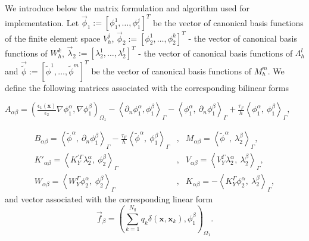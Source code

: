 We introduce below the matrix formulation and algorithm used for implementation. Let $\vec{\phi}_1 := [\phi_1^1, \dots, \phi_1^j]^T$ be the vector of canonical basis
functions of the finite element space $V_{h}^{j}$, $\vec{\phi}_2 := [\phi_2^1, \dots, \phi_2^k]^T$ - the vector of canonical basis
functions of $W_{h}^{k}$,  $\vec{\lambda}_2 := [\lambda_2^1, \dots, \lambda_2^l]^T$ - the vector of canonical basis
functions of $\Lambda_{h}^{l}$ and $\vec{\widetilde{\phi}} := [\widetilde{\phi}^1, \dots, \widetilde{\phi}^m]^T$ be the vector of canonical basis
functions of  $M_{h}^{m}$. We define the following matrices associated with the corresponding bilinear forms
\begin{center}
$A_{\alpha \beta} = \left(  \tfrac{\epsilon_1(\mathbf{x})}{\epsilon_2} \nabla \phi^{\alpha}_1, \nabla \phi^{\beta}_1  \right)_{\Omega_1}  - \left< \partial_n \phi^{\alpha}_1 ,  \phi^{\beta}_1 \right>_{\Gamma}   - \left< \phi^{\alpha}_1  , \ \partial_n \phi^{\beta}_1  \right>_{\Gamma}   + \tfrac{\tau_F}{h} \left< \phi^{\alpha}_1 ,\ \phi^{\beta}_1  \right>_{\Gamma}, $                                                                                                                                                                                                                                                                                                        \end{center}
\vspace{-15pt}
\begin{align*}
B_{\alpha \beta} = \left< \widetilde{\phi}^{\alpha}, \ \partial_n \phi^{\beta}_1  \right>_{\Gamma} - \tfrac{\tau_F}{h} \left< \widetilde{\phi}^{\alpha},\ \phi^{\beta}_1  \right>_{\Gamma} 
 &,& 
M_{\alpha \beta} =\left< \widetilde{\phi}^{\alpha}, \ \lambda^{\beta}_2 \right>_{\Gamma}, \\
K'_{\alpha \beta} = \left<K_{Y}^{'\Gamma} \lambda^{\alpha}_2, \ \phi^{\beta}_2 \right>_{\Gamma}
 &,&
V_{\alpha \beta} = \left<V_{Y}^{\Gamma} \lambda^{\alpha}_2, \ \lambda^{\beta}_2 \right>_{\Gamma}, \\
W_{\alpha \beta} = \left< W_{Y}^{\Gamma} \phi^{\alpha}_2, \ \phi^{\beta}_2 \right>_{\Gamma}
 &,&
K_{\alpha \beta} = -\left<K_{Y}^{\Gamma} \phi^{\alpha}_2, \ \lambda^{\beta}_2 \right>_{\Gamma},
\end{align*}
and vector associated with the corresponding linear form
\begin{equation*}
\vec{f}_{\beta} = \left(  \sum_{k=1}^{N_q} q_k\delta(\mathbf{x},\mathbf{x}_k),   \phi^{\beta}_1 \right)_{\Omega_1}.
\end{equation*}

